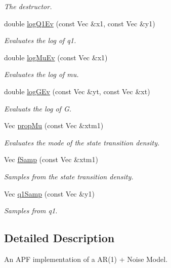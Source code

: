 \begin{DoxyCompactItemize}
\begin{DoxyCompactList}\small\item\em The destructor. \end{DoxyCompactList}\item 
double \hyperlink{classNAr1APFFilter_a0839d99fe62312b8a2c5c781b879fa79}{log\+Q1\+Ev} (const Vec \&x1, const Vec \&y1)
\begin{DoxyCompactList}\small\item\em Evaluates the log of q1. \end{DoxyCompactList}\item 
double \hyperlink{classNAr1APFFilter_ad85b9a81c93f86ebcc8e837bb2ca010f}{log\+Mu\+Ev} (const Vec \&x1)
\begin{DoxyCompactList}\small\item\em Evaluates the log of mu. \end{DoxyCompactList}\item 
double \hyperlink{classNAr1APFFilter_afabcd7acb729a62955856c9737e76059}{log\+G\+Ev} (const Vec \&yt, const Vec \&xt)
\begin{DoxyCompactList}\small\item\em Evaluats the log of G. \end{DoxyCompactList}\item 
Vec \hyperlink{classNAr1APFFilter_a92a000138b5440613ab85c3811eb5525}{prop\+Mu} (const Vec \&xtm1)
\begin{DoxyCompactList}\small\item\em Evaluates the mode of the state transition density. \end{DoxyCompactList}\item 
Vec \hyperlink{classNAr1APFFilter_a7490ba7d06d2d82930afce64100cce99}{f\+Samp} (const Vec \&xtm1)
\begin{DoxyCompactList}\small\item\em Samples from the state transition density. \end{DoxyCompactList}\item 
Vec \hyperlink{classNAr1APFFilter_a294a2044c95ba6e013758fa62f3ef979}{q1\+Samp} (const Vec \&y1)
\begin{DoxyCompactList}\small\item\em Samples from q1. \end{DoxyCompactList}\end{DoxyCompactItemize}


\subsection{Detailed Description}
An A\+PF implementation of a A\+R(1) + Noise Model. 

